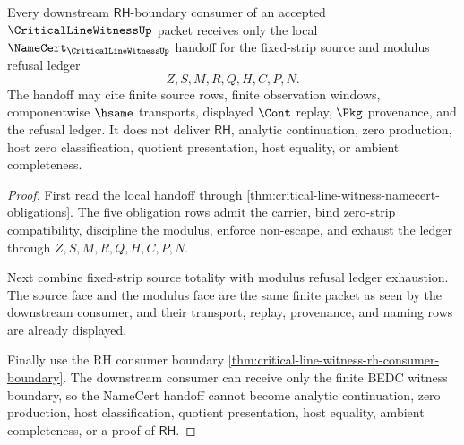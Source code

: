 \begin{theorem}
\label{thm:critical-line-witness-rh-boundary-namecert-handoff}
Every downstream $\mathsf{RH}$-boundary consumer of an accepted
$\CriticalLineWitnessUp$ packet receives only the local
$\NameCert_{\CriticalLineWitnessUp}$ handoff for the fixed-strip source and
modulus refusal ledger
$$
Z,S,M,R,Q,H,C,P,N.
$$
The handoff may cite finite source rows, finite observation windows,
componentwise $\hsame$ transports, displayed $\Cont$ replay, $\Pkg$
provenance, and the refusal ledger. It does not deliver $\mathsf{RH}$,
analytic continuation, zero production, host zero classification, quotient
presentation, host equality, or ambient completeness.
\end{theorem}
\begin{proof}
First read the local handoff through
\autoref{thm:critical-line-witness-namecert-obligations}. The five obligation
rows admit the carrier, bind zero-strip compatibility, discipline the
modulus, enforce non-escape, and exhaust the ledger through
$Z,S,M,R,Q,H,C,P,N$.

Next combine fixed-strip source totality with modulus refusal ledger
exhaustion. The source face and the modulus face are the same finite packet
as seen by the downstream consumer, and their transport, replay, provenance,
and naming rows are already displayed.

Finally use the RH consumer boundary
\autoref{thm:critical-line-witness-rh-consumer-boundary}. The downstream
consumer can receive only the finite BEDC witness boundary, so the NameCert
handoff cannot become analytic continuation, zero production, host
classification, quotient presentation, host equality, ambient completeness,
or a proof of $\mathsf{RH}$.
\end{proof}
